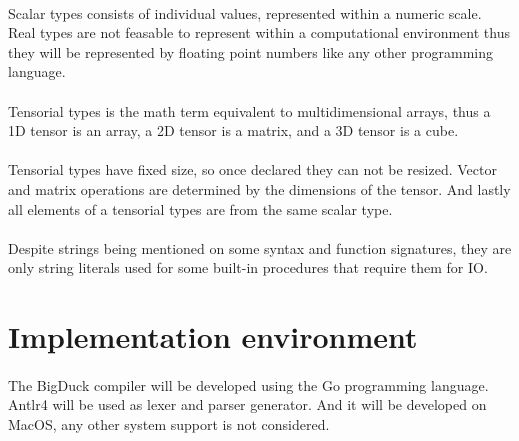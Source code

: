 \documentclass[12pt, titlepage]{article}
\begin{document}
\paragraph{} Scalar types consists of individual values, represented within
a numeric scale. Real types are not feasable to represent within a
computational environment thus they will be represented by floating point
numbers like any other programming language.

\paragraph{} Tensorial types is the math term equivalent to multidimensional
arrays, thus a 1D tensor is an array, a 2D tensor is a matrix, and a 3D tensor
is a cube.

\paragraph{} Tensorial types have fixed size, so once declared they can not be
resized. Vector and matrix operations are determined by the dimensions of the
tensor. And lastly all elements of a tensorial types are from the same scalar
type.

\paragraph{} Despite strings being mentioned on some syntax and function
signatures, they are only string literals used for some built-in procedures
that require them for IO. 

\section{Implementation environment}
\paragraph{} The BigDuck compiler will be developed using the Go programming
language. Antlr4 will be used as lexer and parser generator. And it will be
developed on MacOS, any other system support is not considered.
\end{document}
